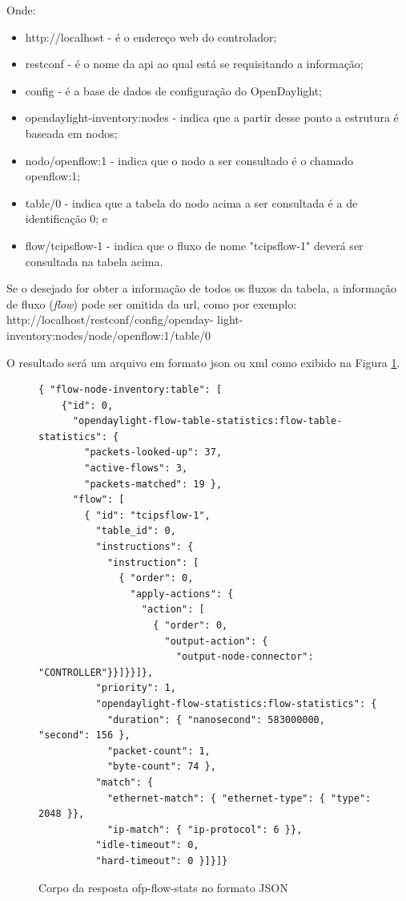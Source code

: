 Onde:
\begin{itemize}
    \item http://localhost - é o endereço \gls{web} do controlador;
    \item restconf - é o nome da \gls{api} ao qual está se requisitando a informação;
    \item config - é a base de dados de configuração do OpenDaylight;
    \item opendaylight-inventory:nodes - indica que a partir desse ponto a estrutura é baseada em nodos;
    \item nodo/openflow:1 - indica que o nodo a ser consultado é o chamado openflow:1;
    \item table/0 - indica que a tabela do nodo acima a ser consultada é a de identificação 0; e
    \item flow/tcipsflow-1 - indica que o fluxo de nome "tcipsflow-1" deverá ser consultada na tabela acima.
\end{itemize}

Se o desejado for obter a informação de todos os fluxos da tabela, a informação de fluxo  (\textit{flow}) pode ser omitida da \gls{url}, como por exemplo: http://localhost/restconf/config/openday- light-inventory:nodes/node/openflow:1/table/0

O resultado será um arquivo em formato \gls{json} ou \gls{xml} como exibido na Figura \ref{cod:ofp-flow-stats}.

\begin{figure}[H]
  \centering
  \caption{Corpo da resposta ofp-flow-stats no formato JSON}
\begin{lstlisting}[belowskip=-0.05 \baselineskip]
{ "flow-node-inventory:table": [
    {"id": 0,
      "opendaylight-flow-table-statistics:flow-table-statistics": {
        "packets-looked-up": 37,
        "active-flows": 3,
        "packets-matched": 19 },
      "flow": [
        { "id": "tcipsflow-1",
          "table_id": 0,
          "instructions": {
            "instruction": [
              { "order": 0,
                "apply-actions": {
                  "action": [
                    { "order": 0,
                      "output-action": {
                        "output-node-connector": "CONTROLLER"}}]}}]},
          "priority": 1,
          "opendaylight-flow-statistics:flow-statistics": {
            "duration": { "nanosecond": 583000000, "second": 156 },
            "packet-count": 1, 
            "byte-count": 74 },
          "match": {
            "ethernet-match": { "ethernet-type": { "type": 2048 }},
            "ip-match": { "ip-protocol": 6 }},
          "idle-timeout": 0,
          "hard-timeout": 0 }]}]}
\end{lstlisting}
 \label{cod:ofp-flow-stats}
 \end{figure}


